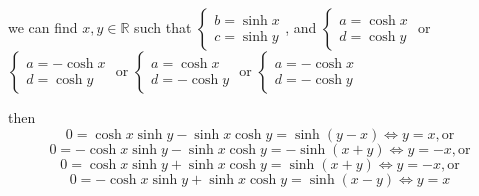 \documentclass[10pt]{article}
\newcommand{\<}[1]{\langle #1 \rangle}
\begin{document}
 we can find $x,y\in\mathbb{R}$ such that $\begin{cases}
  b=\sinh{x} \\
  c=\sinh{y}
  \end{cases}$, and $\begin{cases}
  a=\cosh{x} \\
  d=\cosh{y}
  \end{cases}$ or $\begin{cases}
  a=-\cosh{x} \\
  d=\cosh{y}
  \end{cases}$ or $\begin{cases}
  a=\cosh{x} \\
  d=-\cosh{y}
  \end{cases}$ or $\begin{cases}
  a=-\cosh{x} \\
  d=-\cosh{y}
  \end{cases}$ \par
then 
$$0=\cosh{x}\sinh{y}-\sinh{x}\cosh{y}=\sinh{(y-x)}\iff y=x, \text{or}$$
$$0=-\cosh{x}\sinh{y}-\sinh{x}\cosh{y}=-\sinh{(x+y)}\iff y=-x, \text{or}$$
$$0=\cosh{x}\sinh{y}+\sinh{x}\cosh{y}=\sinh{(x+y)}\iff y=-x, \text{or}$$
$$0=-\cosh{x}\sinh{y}+\sinh{x}\cosh{y}=\sinh{(x-y)}\iff y=x$$
\end{document}
